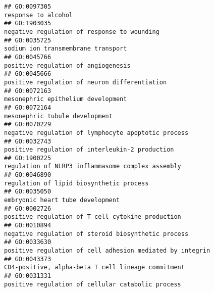 \documentclass[
]{article}
\begin{document}
\begin{verbatim}
## GO:0097305                                                                                                                              response to alcohol
## GO:1903035                                                                                                      negative regulation of response to wounding
## GO:0035725                                                                                                               sodium ion transmembrane transport
## GO:0045766                                                                                                              positive regulation of angiogenesis
## GO:0045666                                                                                                    positive regulation of neuron differentiation
## GO:0072163                                                                                                               mesonephric epithelium development
## GO:0072164                                                                                                                   mesonephric tubule development
## GO:0070229                                                                                              negative regulation of lymphocyte apoptotic process
## GO:0032743                                                                                                  positive regulation of interleukin-2 production
## GO:1900225                                                                                                regulation of NLRP3 inflammasome complex assembly
## GO:0046890                                                                                                         regulation of lipid biosynthetic process
## GO:0035050                                                                                                                 embryonic heart tube development
## GO:0002726                                                                                                positive regulation of T cell cytokine production
## GO:0010894                                                                                              negative regulation of steroid biosynthetic process
## GO:0033630                                                                                        positive regulation of cell adhesion mediated by integrin
## GO:0043373                                                                                               CD4-positive, alpha-beta T cell lineage commitment
## GO:0031331                                                                                                positive regulation of cellular catabolic process

\end{verbatim}
\end{document}
